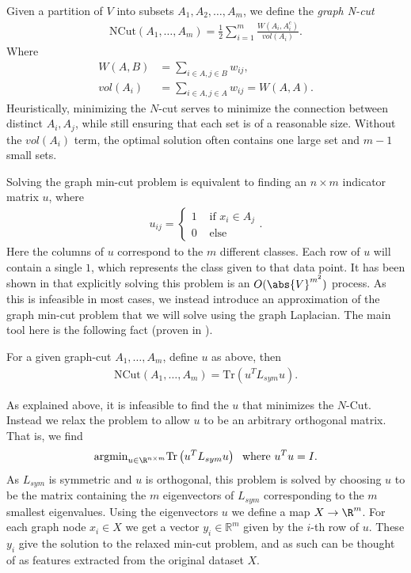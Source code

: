 \documentclass[journal]{IEEEtran}
\begin{document}
Given a partition of $V$ into subsets $A_1,A_2,\ldots,A_m$, we define the
\emph{graph N-cut}
\begin{align}
  \text{NCut}(A_1,\ldots,A_m) = \frac{1}{2}\sum_{i=1}^m
  \frac{W(A_i,A_i^c)}{vol(A_i)}.
\end{align}
Where
\begin{align}W(A,B) &= \sum_{i\in A, j\in B}w_{ij},\\
  vol(A_i) &= \sum_{i\in A,j\in A}w_{ij} = W(A,A).
\end{align}
Heuristically, minimizing the $N$-cut serves to minimize the connection between
distinct $A_i, A_j$, while still ensuring that each set is of a reasonable
size. Without the $vol(A_i)$ term, the optimal solution often contains one large
set and $m-1$ small sets.

Solving the graph min-cut problem is equivalent to finding an $n \times m$
indicator matrix $u$, where
\begin{align}
  \label{eqn:indicatorMatrix}
  u_{ij} = \begin{cases} 1 & \text{ if } x_i \in A_j \\ 0 & \text{ else}
  \end{cases}.
\end{align}
Here the columns of $u$ correspond to the $m$ different classes. Each row of $u$
will contain a single $1$, which represents the class given to that data point.
It has been shown in \cite{Goldschmidt94} that explicitly solving this problem
is an $O(\abs{V}^{m^2})$ process. As this is infeasible in most cases, we
instead introduce an approximation of the graph min-cut problem that we will
solve using the graph Laplacian. The main tool here is the following fact
(proven in \cite{vonLuxburg07}).
\begin{fact}
  For a given graph-cut $A_1,\ldots,A_m$, define $u$ as above, then
  \begin{align}
    \text{NCut}(A_1,\ldots,A_m) = \text{Tr}\left(u^T L_{sym} u\right).
  \end{align}
\end{fact}
As explained above, it is infeasible to find the $u$ that minimizes the
$N$-Cut. Instead we relax the problem to allow $u$ to be an arbitrary orthogonal
matrix. That is, we find
\begin{align}
  \text{argmin}_{u\in \R^{n\times m}} \text{Tr}\left(u^T L_{sym} u\right)\;\text{
  where }u^Tu=I.
\end{align}
As $L_{sym}$ is symmetric and $u$ is orthogonal, this problem is solved by
choosing $u$ to be the matrix containing the $m$ eigenvectors of $L_{sym}$
corresponding to the $m$ smallest eigenvalues. Using the eigenvectors $u$ we
define a map $X \to \R^m$. For each graph node $x_i\in X$ we get a vector
$y_i\in\mathbb{R}^m$ given by the $i$-th row of $u$. These $y_i$ give the
solution to the relaxed min-cut problem, and as such can be thought of as
features extracted from the original dataset $X$.
\end{document}
